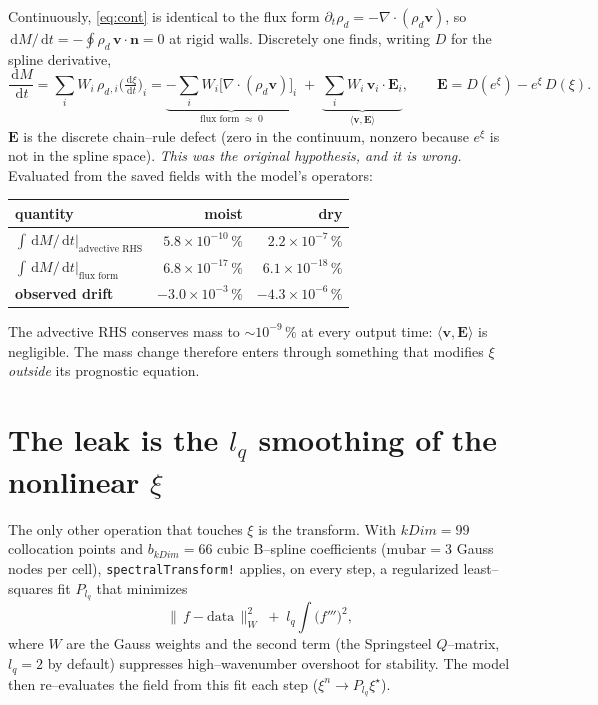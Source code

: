 \documentclass[11pt]{article}
\newcommand{\dd}{\,\mathrm{d}}
\newcommand{\vv}{\mathbf{v}}
\newcommand{\rd}{\rho_d}
\begin{document}
Continuously, \eqref{eq:cont} is identical to the flux form
$\partial_t\rd=-\nabla\cdot(\rd\vv)$, so $\dd M/\dd t=-\oint\rd\,\vv\cdot\mathbf n=0$
at rigid walls. Discretely one finds, writing $D$ for the spline derivative,
\begin{equation}
  \frac{\dd M}{\dd t}
   = \sum_i W_i\,\rd{}_{,i}\Big(\tfrac{\dd\xi}{\dd t}\Big)_i
   = \underbrace{-\sum_i W_i\big[\nabla\!\cdot(\rd\vv)\big]_i}_{\text{flux form}\;\approx\;0}
     \;+\; \underbrace{\sum_i W_i\,\vv_i\cdot\mathbf E_i}_{\langle\vv,\mathbf E\rangle},
  \qquad
  \mathbf E = D(e^{\xi})-e^{\xi}\,D(\xi).
  \label{eq:defect}
\end{equation}
$\mathbf E$ is the discrete chain--rule defect (zero in the continuum, nonzero
because $e^{\xi}$ is not in the spline space). \emph{This was the original
hypothesis, and it is wrong.} Evaluated from the saved fields with the model's
operators:
\begin{center}
\begin{tabular}{lrr}
\hline
quantity & moist & dry \\
\hline
$\int \dd M/\dd t\big|_{\text{advective RHS}}$ & $5.8\times10^{-10}\,\%$ & $2.2\times10^{-7}\,\%$ \\
$\int \dd M/\dd t\big|_{\text{flux form}}$      & $6.8\times10^{-17}\,\%$ & $6.1\times10^{-18}\,\%$ \\
\textbf{observed drift}                          & $-3.0\times10^{-3}\,\%$ & $-4.3\times10^{-6}\,\%$ \\
\hline
\end{tabular}
\end{center}
The advective RHS conserves mass to $\sim10^{-9}\,\%$ at every output time:
$\langle\vv,\mathbf E\rangle$ is negligible. The mass change therefore enters
through something that modifies $\xi$ \emph{outside} its prognostic equation.

\section{The leak is the $l_q$ smoothing of the nonlinear $\xi$}

The only other operation that touches $\xi$ is the transform. With $kDim=99$
collocation points and $b_{kDim}=66$ cubic B--spline coefficients
($\mathrm{mubar}=3$ Gauss nodes per cell), \verb|spectralTransform!| applies, on
every step, a regularized least--squares fit $P_{l_q}$ that minimizes
\begin{equation}
  \big\|\,f-\text{data}\,\big\|^2_{W} \;+\; l_q \int \big(f'''\big)^2 ,
  \label{eq:lq}
\end{equation}
where $W$ are the Gauss weights and the second term (the Springsteel $Q$--matrix,
$l_q=2$ by default) suppresses high--wavenumber overshoot for stability. The model
then re--evaluates the field from this fit each step
($\xi^n\to P_{l_q}\xi^{\star}$).
\end{document}

